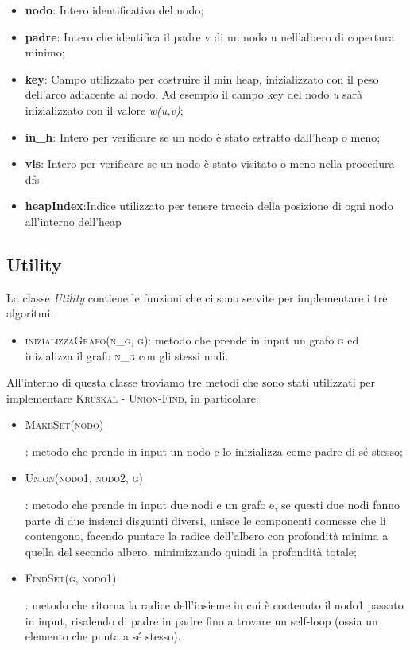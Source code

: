 \begin{itemize}
    \item \textbf{nodo}: Intero identificativo del nodo;
    \item \textbf{padre}: Intero che identifica il padre v di un nodo u nell'albero di copertura minimo;
    \item \textbf{key}: Campo utilizzato per costruire il min heap, inizializzato con il peso dell'arco adiacente al nodo. Ad esempio il campo key del nodo \emph{u} sarà inizializzato con il valore \emph{w(u,v)};
    \item \textbf{in\_h}: Intero per verificare se un nodo è stato estratto dall'heap o meno;
    \item \textbf{vis}: Intero per verificare se un nodo è stato visitato o meno nella procedura dfs
    \item \textbf{heapIndex}:Indice utilizzato per tenere traccia della posizione di ogni nodo all'interno dell'heap
\end{itemize}


\subsection{Utility}
\label{Utility}

La classe \textit{Utility} contiene le funzioni che ci sono servite per implementare i tre algoritmi. 

\begin{itemize}
    \item \textsc{inizializzaGrafo(n\_g, g)}: metodo che prende in input un grafo \textsc{g} ed inizializza il grafo \textsc{n\_g} con gli stessi nodi.
\end{itemize} 

All'interno di questa classe troviamo tre metodi che sono stati utilizzati per implementare \textsc{Kruskal - Union-Find}, in particolare:
\begin{itemize}
    \item \hypertarget{makeset}{\textsc{MakeSet(nodo)}}: metodo che prende in input un nodo e lo inizializza come padre di sé stesso;
    \item \hypertarget{union}{\textsc{Union(nodo1, nodo2, g)}}: metodo che prende in input due nodi e un grafo e, se questi due nodi fanno parte di due insiemi disguinti diversi, unisce le componenti connesse che li contengono, facendo puntare la radice dell'albero con profondità minima a quella del secondo albero, minimizzando quindi la profondità totale;
    \item \hypertarget{findset}{\textsc{FindSet(g, nodo1)}}: metodo che ritorna la radice dell'insieme in cui è contenuto il nodo1 passato in input, risalendo di padre in padre fino a trovare un self-loop (ossia un elemento che punta a sé stesso). 
\end{itemize}

